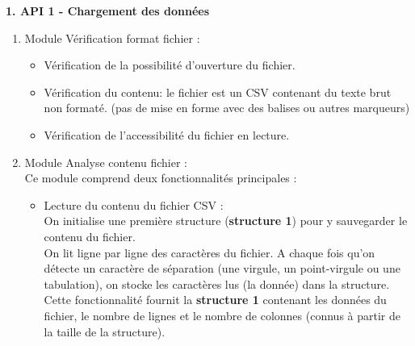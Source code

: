 			\begin{description}[style=unboxed,leftmargin=0.2cm]
			
				\item\textbf{1. API 1 - Chargement des données}
				\begin{enumerate}
				
					\item Module Vérification format fichier :\\
					\begin{itemize}
						\item Vérification de la possibilité d'ouverture du fichier.
						\item Vérification du contenu:  le fichier est un CSV contenant du texte brut non formaté. (pas de mise en forme avec des balises ou autres marqueurs)
						\item Vérification de l'accessibilité du fichier en lecture.
					\end{itemize}
				
					\item Module Analyse contenu fichier :\\
					Ce module comprend deux fonctionnalités principales :
					\begin{itemize}
						\item Lecture du contenu du fichier CSV :\\
						On initialise une première structure (\textbf{structure 1}) pour y sauvegarder le contenu du fichier.\\
						On lit ligne par ligne des caractères du fichier. A chaque fois qu'on détecte un caractère de séparation (une virgule, un point-virgule ou une tabulation), on stocke les caractères lus (la donnée) dans la structure.\\
						Cette fonctionnalité fournit la \textbf{structure 1} contenant les données du fichier, le nombre de lignes et le nombre de colonnes (connus à partir de la taille de la structure).\\
						

\end{itemize}
\end{enumerate}
\end{description}
